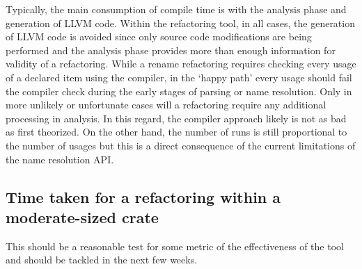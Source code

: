 Typically, the main consumption of compile time is with the analysis phase and generation of LLVM code. Within the refactoring tool, in all cases, the generation of LLVM code is avoided since only source code modifications are being performed and the analysis phase provides more than enough information for validity of a refactoring. While a rename refactoring requires checking every usage of a declared item using the compiler, in the `happy path' every usage should fail the compiler check during the early stages of parsing or name resolution. Only in more unlikely or unfortunate cases will a refactoring require any additional processing in analysis. In this regard, the compiler approach likely is not as bad as first theorized. On the other hand, the number of runs is still proportional to the number of usages but this is a direct consequence of the current limitations of the name resolution API.

\subsection{Time taken for a refactoring within a moderate-sized crate}
This should be a reasonable test for some metric of the effectiveness of the tool and should be tackled in the next few weeks.
